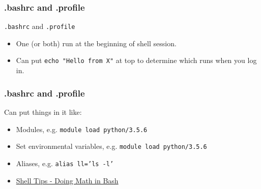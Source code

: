 \documentclass{beamer}
\newcommand{\code}[1]{\colorbox{codegray}{\texttt{#1}}}
\begin{document}
\begin{frame}
\frametitle{.bashrc and .profile}
\code{.bashrc} and \code{.profile}
\bigskip
\begin{itemize}
    \item One (or both) run at the beginning of shell session.
    \bigskip
    \pause
    \item Can put \code{echo "Hello from X"} at top to determine which runs when you log in.
\end{itemize}
\end{frame}


\begin{frame}
\frametitle{.bashrc and .profile}
Can put things in it like:
\bigskip
\begin{itemize}
    \item Modules, e.g. \code{module load python/3.5.6}
    \bigskip
    \pause
    \item Set environmental variables, e.g. \code{module load python/3.5.6}
    \pause
    \bigskip
    \item Aliases, e.g. \code{alias ll='ls -l'}
    \pause
    \bigskip
    \item \href{https://www.shell-tips.com/bash/math-arithmetic-calculation/}{Shell Tips - Doing Math in Bash}
\end{itemize}
\end{frame}
\end{document}
